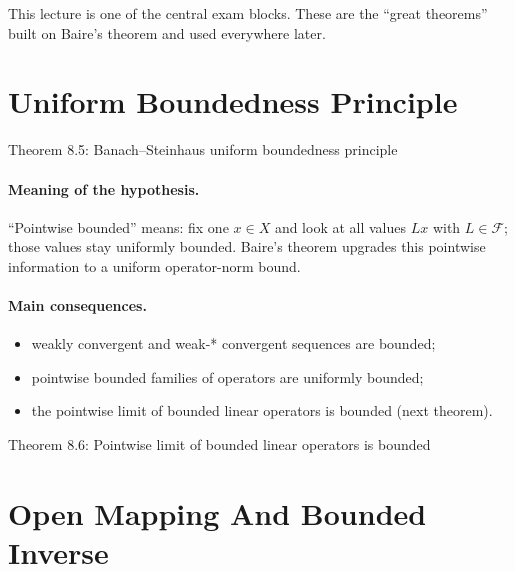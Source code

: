 \documentclass[11pt]{article}
\begin{document}

\vspace{0.8em}

\begin{focusbox}
This lecture is one of the central exam blocks. These are the ``great theorems'' built on Baire's theorem and used everywhere later.
\end{focusbox}

\tableofcontents

\section{Uniform Boundedness Principle}

\begin{thmbox}{Theorem 8.5: Banach--Steinhaus uniform boundedness principle}
\thmBanachSteinhaus
\end{thmbox}

\paragraph{Meaning of the hypothesis.}
``Pointwise bounded'' means: fix one $x\in X$ and look at all values $Lx$ with $L\in\mathcal F$; those values stay uniformly bounded. Baire's theorem upgrades this pointwise information to a uniform operator-norm bound.

\paragraph{Main consequences.}
\begin{itemize}
\item weakly convergent and weak-* convergent sequences are bounded;
\item pointwise bounded families of operators are uniformly bounded;
\item the pointwise limit of bounded linear operators is bounded (next theorem).
\end{itemize}

\begin{thmbox}{Theorem 8.6: Pointwise limit of bounded linear operators is bounded}
\thmLimitOperatorBounded
\end{thmbox}

\section{Open Mapping And Bounded Inverse}
\end{document}

